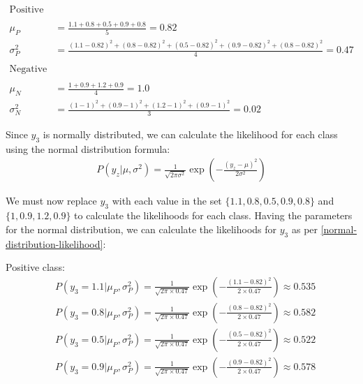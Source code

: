 \documentclass[12pt]{article}
\begin{document}
\begin{enumerate}[leftmargin=\labelsep]
    \vspace{10pt}
{
\begin{equation*}
    \begin{array}{ll}
        \text{Positive class:} & \\
        \\
        \mu_P &= \frac{1.1 + 0.8 + 0.5 + 0.9 + 0.8}{5} = 0.82 \\[10pt]
        \sigma_P^2 &= \frac{(1.1 - 0.82)^2 + (0.8 - 0.82)^2 + (0.5 - 0.82)^2 + (0.9 - 0.82)^2 + (0.8 - 0.82)^2}{4} = 0.47 \\
        \\
        \text{Negative class:} & \\
        \\
        \mu_N &= \frac{1 + 0.9 + 1.2 + 0.9}{4} = 1.0 \\[10pt]
        \sigma_N^2 &= \frac{(1 - 1)^2 + (0.9 - 1)^2 + (1.2 - 1)^2 + (0.9 - 1)^2}{3} = 0.02
    \end{array}
\end{equation*}
}

\vspace{10pt}
    Since $y_3$ is normally distributed, we can calculate the likelihood for each class using the normal distribution formula:
    \begin{equation}\label{normal-distribution-likelihood}
        \begin{aligned}
            P(y_z|\mu, \sigma^2) = \frac{1}{\sqrt{2\pi \sigma^2}} \exp\left(-\frac{(y_z - \mu)^2}{2\sigma^2}\right)
        \end{aligned}
    \end{equation}

    \newpage
    We must now replace $y_3$ with each value in the set $\{1.1, 0.8, 0.5, 0.9, 0.8\}$ and $\{1, 0.9, 1.2, 0.9\}$ 
    to calculate the likelihoods for each class.
    Having the parameters for the normal distribution, we can calculate the likelihoods for $y_3$ as per \eqref{normal-distribution-likelihood}:
    
    \vspace{10pt}
    Positive class:
    \begin{equation*}
        \begin{aligned}
            &P(y_3 = 1.1|\mu_P, \sigma_P^2) = \frac{1}{\sqrt{2\pi \times 0.47}} \exp\left(-\frac{(1.1 - 0.82)^2}{2 \times 0.47}\right) \approx 0.535\\
            &P(y_3 = 0.8|\mu_P, \sigma_P^2) = \frac{1}{\sqrt{2\pi \times 0.47}} \exp\left(-\frac{(0.8 - 0.82)^2}{2 \times 0.47}\right) \approx 0.582\\
            &P(y_3 = 0.5|\mu_P, \sigma_P^2) = \frac{1}{\sqrt{2\pi \times 0.47}} \exp\left(-\frac{(0.5 - 0.82)^2}{2 \times 0.47}\right) \approx 0.522\\
            &P(y_3 = 0.9|\mu_P, \sigma_P^2) = \frac{1}{\sqrt{2\pi \times 0.47}} \exp\left(-\frac{(0.9 - 0.82)^2}{2 \times 0.47}\right) \approx 0.578
        \end{aligned}
    \end{equation*}



\end{enumerate}
\end{document}
